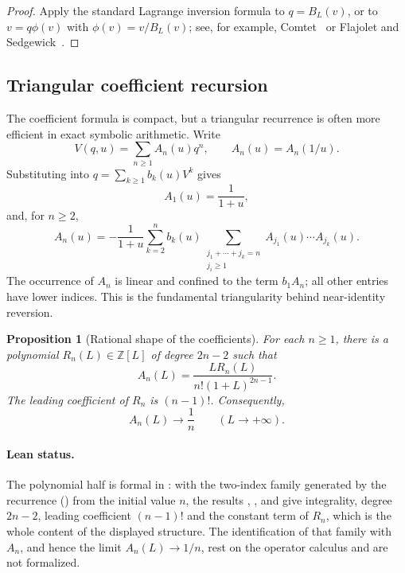\documentclass[11pt,a4paper]{article}
\numberwithin{equation}{section}
\newtheorem{proposition}[theorem]{Proposition}
\theoremstyle{definition}
\theoremstyle{remark}
\newcommand{\Acoef}{A}
\begin{document}
\begin{proof}
Apply the standard Lagrange inversion formula to \(q=B_L(v)\), or to
\(v=q\phi(v)\) with \(\phi(v)=v/B_L(v)\); see, for example,
Comtet~\cite{Comtet} or Flajolet and Sedgewick~\cite{FlajoletSedgewick}.
\end{proof}

\subsection{Triangular coefficient recursion}

The coefficient formula is compact, but a triangular recurrence is often
more efficient in exact symbolic arithmetic.  Write
\begin{equation}\label{eq:V-series}
  V(q,u)=\sum_{n\ge1}A_n(u)q^n,
  \qquad A_n(u)=\Acoef_n(1/u).
\end{equation}
Substituting into \(q=\sum_{k\ge1}b_k(u)V^k\) gives
\begin{equation}\label{eq:A1}
  A_1(u)=\frac1{1+u},
\end{equation}
and, for \(n\ge2\),
\begin{equation}\label{eq:A-recursion}
 A_n(u)=-\frac1{1+u}
 \sum_{k=2}^{n}b_k(u)
 \sum_{\substack{j_1+\cdots+j_k=n\\j_i\ge1}}
 A_{j_1}(u)\cdots A_{j_k}(u).
\end{equation}
The occurrence of \(A_n\) is linear and confined to the term
\(b_1A_n\); all other entries have lower indices.  This is the fundamental
triangularity behind near-identity reversion.

\begin{proposition}[Rational shape of the coefficients]\label{prop:A-shape}
For each \(n\ge1\), there is a polynomial \(R_n(L)\in\mathbb Z[L]\) of
degree \(2n-2\) such that
\begin{equation}\label{eq:A-shape}
  \Acoef_n(L)=\frac{L R_n(L)}{n!(1+L)^{2n-1}}.
\end{equation}
The leading coefficient of \(R_n\) is \((n-1)!\).  Consequently,
\begin{equation}\label{eq:A-limit}
  \Acoef_n(L)\longrightarrow\frac1n
  \qquad (L\to+\infty).
\end{equation}
\end{proposition}

\paragraph{Lean status.}
The polynomial half is formal in : with
 the two-index family generated by the recurrence
() from the initial value \(n\), the results
, ,
 and  give
integrality, degree \(2n-2\), leading coefficient \((n-1)!\) and the constant term of \(R_n\),
which is the whole content of the displayed structure.  The identification of that family with
\(A_n\), and hence the limit \(A_n(L)\to1/n\), rest on the operator calculus and are not
formalized.
\end{document}
